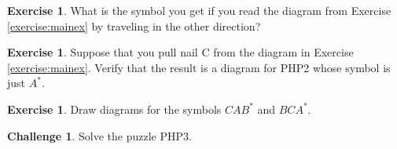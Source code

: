 \documentclass[12pt,letterpaper]{article}
\theoremstyle{definition}
\newtheorem{exercise}[question]{Exercise}
\newtheorem*{challenge}{Challenge}
\begin{document}
\begin{exercise}
What is the symbol you get if you read the diagram from Exercise \ref{exercise:mainex} by traveling in the other direction?
\end{exercise}

\begin{exercise}
Suppose that you pull nail C from the diagram in Exercise \ref{exercise:mainex}. Verify that the result is a diagram for PHP2 whose symbol is just $A^*$.
\end{exercise}

\begin{exercise}
Draw diagrams for the symbols $CAB^*$ and $BCA^*$.
\end{exercise}

\begin{challenge}
Solve the puzzle PHP3.
\end{challenge}

\end{document}
